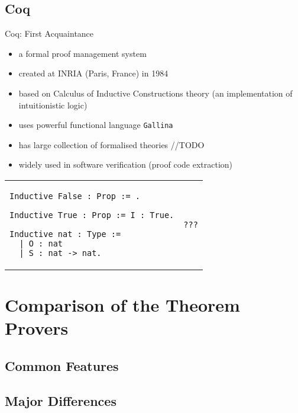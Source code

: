 \documentclass[aspectratio=169]{beamer}
\begin{document}
\subsection{Coq}


\begin{frame}[fragile]{Coq: First Acquaintance}

\vspace{10pt}
\begin{itemize}
  \item a formal proof management system
  \item created at INRIA (Paris, France) in 1984
  \item based on Calculus of Inductive Constructions theory (an implementation of intuitionistic logic)
  \item uses powerful functional language \texttt{Gallina}
  \item has large collection of formalised theories  //TODO
  \item widely used in software verification (proof code extraction)
\end{itemize}

\begin{tabular}{p{.45\linewidth} p{.45\linewidth}}
  \begin{lstlisting}[language=coq, caption={Definition of basic datatypes 
  %in Isabelle:
  }]
Inductive False : Prop := .

Inductive True : Prop := I : True.

Inductive nat : Type :=
  | O : nat
  | S : nat -> nat.
\end{lstlisting}
  &
  
  \begin{lstlisting}[language=isabelle,caption={???}]
  ???
  \end{lstlisting}
\end{tabular}

\end{frame}




\section{Comparison of the Theorem Provers}
\subsection{Common Features}
\subsection{Major Differences}
\end{document}
